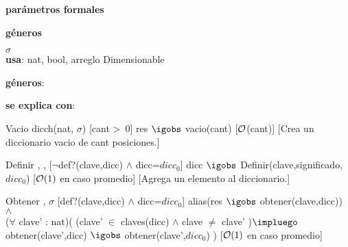 \begin{Interfaz}

	\textbf{parámetros formales}\parindent\\
	\parbox{1.7cm}{\textbf{géneros}} $\sigma$\\
	
	\textbf{usa}: nat, bool, arreglo Dimensionable
	
	\textbf{géneros}: 
	
	\textbf{se explica con}: 
	
	
	\InterfazFuncion
	{Vacio}
	{}
	{dicch(nat, $\sigma$)}
	[cant >\ 0]
	{res $\igobs$ vacio(cant)}
	[$\mathcal{O}$(cant)]
	[Crea un diccionario vacio de cant posiciones.]
	
	\InterfazFuncion
	{Definir}
	{, , }
	{}
	[$\neg$def?(clave,dicc) $\land$ dicc=$dicc_0$]
	{dicc $\igobs$ Definir(clave,significado,$dicc_0$)}
	[$\mathcal{O}(1)$ en caso promedio]
	[Agrega un elemento al diccionario.]	
	
	\InterfazFuncion
	{Obtener}
	{, }
	{$\sigma$}
	[def?(clave,dicc) $\land$ dicc=$dicc_0$]
	{alias(res $\igobs$ obtener(clave,dicc)) 
		$\land$\\ 
		($\forall$ clave' : nat)( (clave' $\in$ claves(dicc) $\land$ clave $\neq$ clave' )$\impluego$ obtener(clave',dicc) $\igobs$ obtener(clave',$dicc_0$) )}
	[$\mathcal{O}(1)$ en caso promedio]
	
\end{Interfaz}

